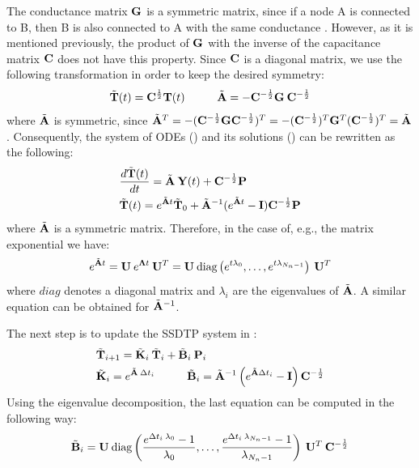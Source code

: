 The conductance matrix $\mathbf{G}$ is a symmetric matrix, since if a node A is connected to B, then B is also connected to A with the same conductance \cite{huang2003}. However, as it is mentioned previously, the product of $\mathbf{G}$ with the inverse of the capacitance matrix $\mathbf{C}$ does not have this property. Since $\mathbf{C}$ is a diagonal matrix, we use the following transformation in order to keep the desired symmetry:
\begin{equation} \label{eq:substitution}
  \tilde{\v{T}}(t) = \m{C}^{\frac{1}{2}} \v{T}(t) \hs \tilde{\m{A}} = -\m{C}^{-\frac{1}{2}} \m{G} \: \m{C}^{-\frac{1}{2}}
\end{equation}
where $\tilde{\mathbf{A}}$ is symmetric, since $\tilde{\mathbf{A}}^T = -(\mathbf{C}^{-\frac{1}{2}} \mathbf{G} \mathbf{C}^{-\frac{1}{2}})^T = -(\mathbf{C}^{-\frac{1}{2}})^T \mathbf{G}^T (\mathbf{C}^{-\frac{1}{2}})^T = \tilde{\mathbf{A}}$. Consequently, the system of ODEs () and its solutions () can be rewritten as the following:
\begin{align*}
  & \frac{d\tilde{\mathbf{T}}(t)}{dt} = \tilde{\mathbf{A}} \: \mathbf{Y}(t) + \mathbf{C}^{-\frac{1}{2}} \mathbf{P} \\
  & \tilde{\mathbf{T}}(t) = e^{\tilde{\mathbf{A}} t} \tilde{\mathbf{T}}_0 + \tilde{\mathbf{A}}^{-1} (e^{\tilde{\mathbf{A}} t} - \mathbf{I}) \mathbf{C}^{-\frac{1}{2}} \mathbf{P}
\end{align*}
where $\tilde{\mathbf{A}}$ is a symmetric matrix. Therefore, in the case of, e.g., the matrix exponential we have:
\begin{equation} \label{eq:matrix-exponential}
  e^{\tilde{\mathbf{A}} t} = \mathbf{U} \: e^{\mathbf{\Lambda} t} \: \mathbf{U}^T = \mathbf{U} \: \text{diag} \left( e^{t \lambda_0}, \dots, e^{t \lambda_{N_n - 1}} \right) \: \mathbf{U}^T
\end{equation}
where $diag$ denotes a diagonal matrix and $\lambda_i$ are the eigenvalues of $\tilde{\mathbf{A}}$. A similar equation can be obtained for $\tilde{\mathbf{A}}^{-1}$.

The next step is to update the SSDTP system in :
\begin{align}
  & \tv{T}_{i+1} = \tm{K}_i \: \tv{T}_i + \tm{B}_i \: \v{P}_i \label{eq:recurrent-equation} \\
  & \tm{K}_i = e^{\tm{A} \: \Delta t_i} \hs \tm{B}_i = \tm{A}^{-1} \left( e^{\tm{A} \Delta t_i} - \m{I} \right) \m{C}^{-\frac{1}{2}} \nonumber
\end{align}
Using the eigenvalue decomposition, the last equation can be computed in the following way:
\[
  \tilde{\mathbf{B}}_i = \mathbf{U} \: \text{diag} \left( \frac{e^{\Delta t_i \: \lambda_0} - 1}{\lambda_0}, \dots, \frac{e^{\Delta t_i \: \lambda_{N_n - 1}} - 1}{\lambda_{N_n - 1}} \right) \: \mathbf{U}^T \: \mathbf{C}^{-\frac{1}{2}}
\]

